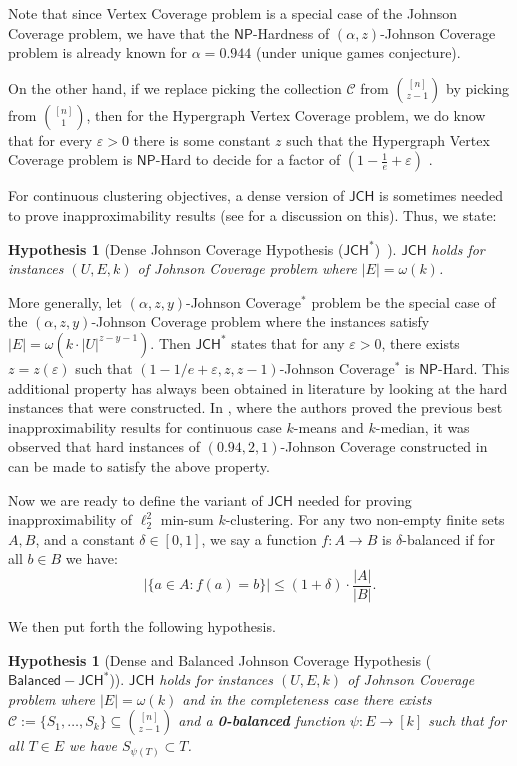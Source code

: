 \documentclass[11pt]{article}
\newtheorem{hypothesis}[theorem]{Hypothesis}
\newcommand{\hyplab}[1]{\label{hyp:#1}}
\newcommand{\eps}{\varepsilon}
\newcommand{\JCH}{$\mathsf{JCH}$\xspace}
\newcommand{\JCHD}{$\mathsf{JCH}^*$\xspace}
\newcommand{\JCHDB}{$\mathsf{Balanced-JCH}^*$\xspace}
\newcommand{\jc}{Johnson Coverage\xspace}
\newcommand{\jcd}{Johnson Coverage$^*$\xspace}
\newcommand{\C}{\mathcal{C}}
\newcommand{\NP}{$\mathsf{NP}$\xspace}
\begin{document}
Note that since Vertex Coverage problem is a special case of the \jc problem, we have that the \NP-Hardness of $(\alpha,z)$-Johnson Coverage problem is already known for $\alpha=0.944$ \cite{AKS11} (under unique games conjecture). 

On the other hand,  if we replace picking the collection $\C$ from $\binom{[n]}{z-1}$ by picking from $\binom{[n]}{1}$, then for the Hypergraph Vertex Coverage problem, we do know that for every $\eps>0$ there is some constant $z$ such that the Hypergraph Vertex Coverage problem is \NP-Hard to decide for a factor of $\left(1-\frac{1}{e}+\varepsilon\right)$ \cite{F98}. 

For continuous clustering objectives, a dense version of \JCH is sometimes needed to prove inapproximability results (see \cite{Cohen-AddadSL22} for a discussion on this). Thus, we state: 

\begin{hypothesis}[Dense Johnson Coverage Hypothesis (\JCHD)~\cite{Cohen-AddadSL22}]
\JCH holds for instances $(U,E,k)$ of \jc problem where $|E|=\omega(k)$.\hyplab{hyp:jchd}
\end{hypothesis}

More generally, let $(\alpha, z, y)$-\jcd problem be the special case of the 
$(\alpha, z, y)$-\jc problem where the instances satisfy $|E| = \omega(k \cdot |U|^{z - y - 1})$. 
Then \JCHD states that for any $\eps > 0$, there exists $z = z(\eps)$ such that 
$(1-1/e + \eps, z, z-1)$-\jcd is \NP-Hard. 
This additional property has always been obtained in literature by looking at the hard instances that were constructed. 
In \cite{Cohen-AddadS19}, where the authors proved the previous best inapproximability results for continuous case $k$-means and $k$-median, 
it was observed that hard instances of $(0.94,2,1)$-\jc constructed in~\cite{AKS11} can be made to satisfy the above property.

Now we are ready to define the variant of \JCH needed for proving inapproximability of $\ell_2^2$ min-sum $k$-clustering.
For any two non-empty finite sets $A,B$, and a constant $\delta\in [0,1]$, we say a function $f:A\to B$ is $\delta$-balanced if for all $b\in B$ we have: 
$$  \left|\{a\in A: f(a)=b\}\right| \le (1+\delta)\cdot \frac{|A|}{|B|}.
$$


We then put forth the following hypothesis.

\begin{hypothesis}[Dense and Balanced Johnson Coverage Hypothesis (\JCHDB)]\hyplab{hyp:jchdb}
\JCH holds for instances $(U,E,k)$ of \jc problem where $|E|=\omega(k)$ and in the completeness case there   exists $\C:=\{S_1,\ldots ,S_k\}\subseteq  \binom{[n]}{z-1}$  and a {\bf 0-balanced} function $\psi:E\to [k]$ such that for all $T\in E$ we have $S_{\psi(T)}\subset T$.
\end{hypothesis}
\end{document}
